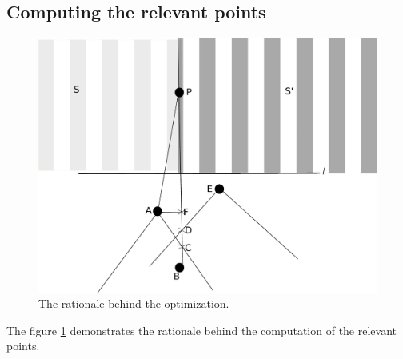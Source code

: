 \subsection{Computing the relevant points}
\begin{figure}%
        \includegraphics{Figures/optimization-rationale.pdf}
    \caption[Optimization]{The rationale behind the optimization.}
	\label{fig:opt-rationale}
\end{figure}
The figure \ref{fig:opt-rationale} demonstrates the rationale behind the computation of the relevant points.
